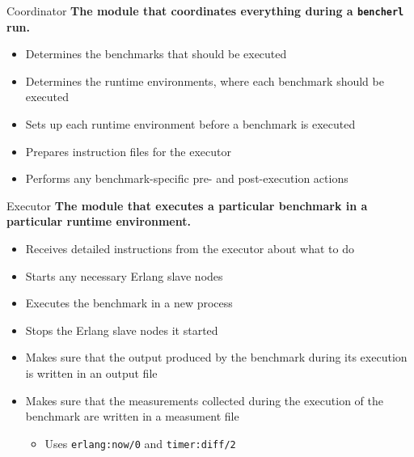 \documentclass{beamer}
\begin{document}
\begin{frame}[t]{Coordinator}
	{\bf The module that coordinates everything during a \texttt{bencherl} run.}
	\begin{itemize}
		\item Determines the \textcolor{burgundy}{benchmarks} that should be executed
		\item Determines the \textcolor{burgundy}{runtime environments}, where each benchmark should be executed
		\item \textcolor{burgundy}{Sets up} each runtime environment before a benchmark is executed
		\item Prepares instruction files for the \textcolor{burgundy}{executor}
		\item Performs any benchmark-specific \textcolor{burgundy}{pre-} and \textcolor{burgundy}{post-execution actions}
	\end{itemize}
\end{frame}

\begin{frame}[t]{Executor}
	{\bf The module that executes a particular benchmark in a particular runtime environment.}
	\begin{itemize}
		\item Receives detailed instructions from the \textcolor{burgundy}{executor} about what to do 
		\item \textcolor{burgundy}{Starts} any necessary Erlang slave nodes
		\item \textcolor{burgundy}{Executes} the benchmark in a new process
		\item \textcolor{burgundy}{Stops} the Erlang slave nodes it started
		\item Makes sure that the \textcolor{burgundy}{output} produced by the benchmark during its execution is written in an output file
		\item Makes sure that the \textcolor{burgundy}{measurements} collected during the execution of the benchmark are written in a measument file 
			\begin{itemize}
				\item Uses \texttt{erlang:now/0} and \texttt{timer:diff/2}
			\end{itemize}
	\end{itemize}
\end{frame}
\end{document}
